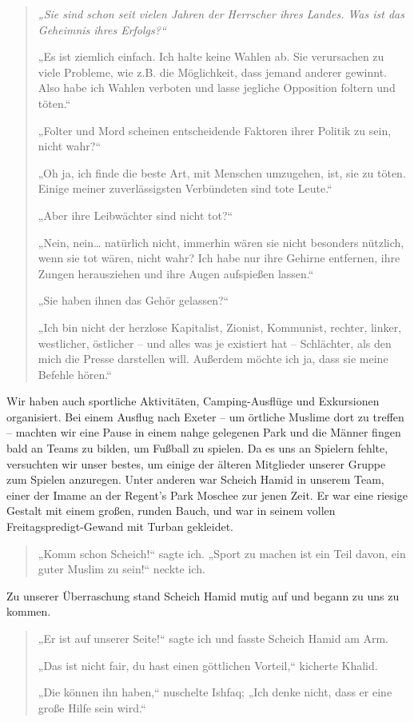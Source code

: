\documentclass[12pt]{memoir}
\begin{document}
\begin{quote}
\itshape
„Sie sind schon seit vielen Jahren der Herrscher ihres Landes.
Was ist das Geheimnis ihres Erfolgs?“

„Es ist ziemlich einfach.
Ich halte keine Wahlen ab.
Sie verursachen zu viele Probleme, wie z.B. die Möglichkeit,
dass jemand anderer gewinnt.
Also habe ich Wahlen verboten und lasse jegliche Opposition foltern und töten.“

„Folter und Mord scheinen entscheidende Faktoren
ihrer Politik zu sein, nicht wahr?“

„Oh ja, ich finde die beste Art, mit Menschen umzugehen, ist, sie zu töten.
Einige meiner zuverlässigsten Verbündeten sind tote Leute.“

„Aber ihre Leibwächter sind nicht tot?“

„Nein, nein… natürlich nicht,
immerhin wären sie nicht besonders nützlich, wenn sie tot wären, nicht wahr?
Ich habe nur ihre Gehirne entfernen,
ihre Zungen herausziehen und ihre Augen aufspießen lassen.“

„Sie haben ihnen das Gehör gelassen?“

„Ich bin nicht der herzlose Kapitalist, Zionist, Kommunist, rechter,
linker, westlicher, östlicher – und alles was je existiert hat –
Schlächter, als den mich die Presse darstellen will.
Außerdem möchte ich ja, dass sie meine Befehle hören.“
\end{quote}

Wir haben auch sportliche Aktivitäten,
Camping-Ausflüge und Exkursionen organisiert.
Bei einem Ausflug nach Exeter –
um örtliche Muslime dort zu treffen –
machten wir eine Pause in einem nahge gelegenen Park
und die Männer fingen bald an Teams zu bilden, um Fußball zu spielen.
Da es uns an Spielern fehlte, versuchten wir unser bestes,
um einige der älteren Mitglieder unserer Gruppe zum Spielen anzuregen.
Unter anderen war Scheich Hamid in unserem Team,
einer der Imame an der Regent’s Park Moschee zur jenen Zeit.
Er war eine riesige Gestalt mit einem großen, runden Bauch,
und war in seinem vollen Freitagspredigt-Gewand mit Turban gekleidet.

\begin{quote}
„Komm schon Scheich!“ sagte ich.
„Sport zu machen ist ein Teil davon, ein guter Muslim zu sein!“ neckte ich.
\end{quote}

Zu unserer Überraschung stand Scheich Hamid mutig auf
und begann zu uns zu kommen.

\begin{quote}
„Er ist auf unserer Seite!“
sagte ich und fasste Scheich Hamid am Arm.

„Das ist nicht fair, du hast einen göttlichen Vorteil,“ kicherte Khalid.

„Die können ihn haben,“ nuschelte Ishfaq;
„Ich denke nicht, dass er eine große Hilfe sein wird.“
\end{quote}
\end{document}
